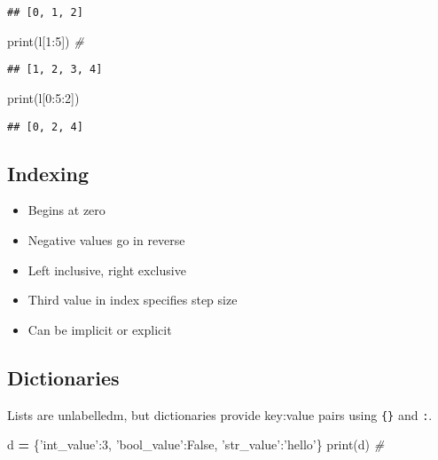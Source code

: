 \documentclass[]{book}
\newenvironment{Shaded}{\begin{snugshade}}{\end{snugshade}}
\newcommand{\BuiltInTok}[1]{#1}
\newcommand{\CommentTok}[1]{\textcolor[rgb]{0.56,0.35,0.01}{\textit{#1}}}
\newcommand{\DecValTok}[1]{\textcolor[rgb]{0.00,0.00,0.81}{#1}}
\newcommand{\NormalTok}[1]{#1}
\newcommand{\OperatorTok}[1]{\textcolor[rgb]{0.81,0.36,0.00}{\textbf{#1}}}
\newcommand{\StringTok}[1]{\textcolor[rgb]{0.31,0.60,0.02}{#1}}
\newcommand{\VariableTok}[1]{\textcolor[rgb]{0.00,0.00,0.00}{#1}}
\providecommand{\tightlist}{%
  \setlength{\itemsep}{0pt}\setlength{\parskip}{0pt}}
\theoremstyle{definition}
\theoremstyle{definition}
\theoremstyle{definition}
\theoremstyle{remark}
\begin{document}
\begin{verbatim}
## [0, 1, 2]
\end{verbatim}

\begin{Shaded}
\begin{Highlighting}[]
\BuiltInTok{print}\NormalTok{(l[}\DecValTok{1}\NormalTok{:}\DecValTok{5}\NormalTok{]) }\CommentTok{# }
\end{Highlighting}
\end{Shaded}

\begin{verbatim}
## [1, 2, 3, 4]
\end{verbatim}

\begin{Shaded}
\begin{Highlighting}[]
\BuiltInTok{print}\NormalTok{(l[}\DecValTok{0}\NormalTok{:}\DecValTok{5}\NormalTok{:}\DecValTok{2}\NormalTok{])}
\end{Highlighting}
\end{Shaded}

\begin{verbatim}
## [0, 2, 4]
\end{verbatim}

\hypertarget{indexing}{%
\subsection{Indexing}\label{indexing}}

\begin{itemize}
\tightlist
\item
  Begins at zero
\item
  Negative values go in reverse
\item
  Left inclusive, right exclusive
\item
  Third value in index specifies step size
\item
  Can be implicit or explicit
\end{itemize}

\hypertarget{dictionaries}{%
\subsection{Dictionaries}\label{dictionaries}}

Lists are unlabelledm, but dictionaries provide key:value pairs using
\texttt{\{\}} and \texttt{:}.

\begin{Shaded}
\begin{Highlighting}[]
\NormalTok{d }\OperatorTok{=}\NormalTok{ \{}\StringTok{'int_value'}\NormalTok{:}\DecValTok{3}\NormalTok{, }
     \StringTok{'bool_value'}\NormalTok{:}\VariableTok{False}\NormalTok{, }
     \StringTok{'str_value'}\NormalTok{:}\StringTok{'hello'}\NormalTok{\}}
\BuiltInTok{print}\NormalTok{(d) }\CommentTok{# }
\end{Highlighting}
\end{Shaded}
\end{document}
